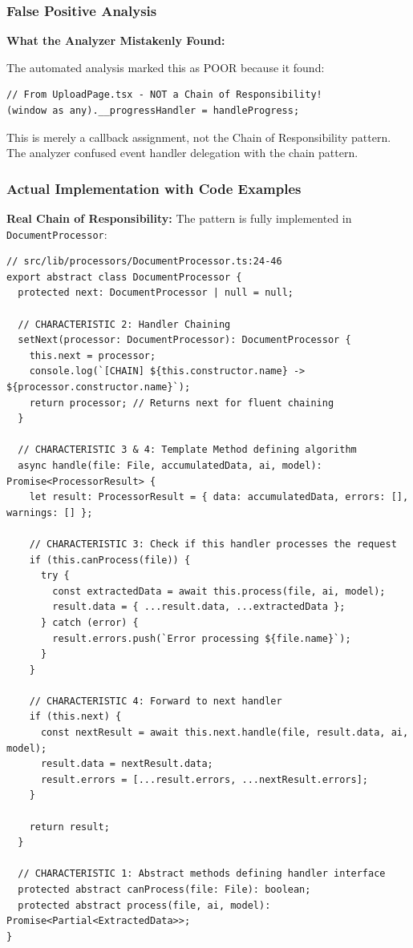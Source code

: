 \documentclass[11pt]{article}
\begin{document}
\subsubsection{False Positive Analysis}
\textbf{What the Analyzer Mistakenly Found:}

The automated analysis marked this as POOR because it found:
\begin{verbatim}
// From UploadPage.tsx - NOT a Chain of Responsibility!
(window as any).__progressHandler = handleProgress;
\end{verbatim}

This is merely a callback assignment, not the Chain of Responsibility pattern. The analyzer confused event handler delegation with the chain pattern.

\subsubsection{Actual Implementation with Code Examples}

\textbf{Real Chain of Responsibility:} The pattern is fully implemented in \texttt{DocumentProcessor}:

\begin{verbatim}
// src/lib/processors/DocumentProcessor.ts:24-46
export abstract class DocumentProcessor {
  protected next: DocumentProcessor | null = null;

  // CHARACTERISTIC 2: Handler Chaining
  setNext(processor: DocumentProcessor): DocumentProcessor {
    this.next = processor;
    console.log(`[CHAIN] ${this.constructor.name} -> ${processor.constructor.name}`);
    return processor; // Returns next for fluent chaining
  }

  // CHARACTERISTIC 3 & 4: Template Method defining algorithm
  async handle(file: File, accumulatedData, ai, model): Promise<ProcessorResult> {
    let result: ProcessorResult = { data: accumulatedData, errors: [], warnings: [] };

    // CHARACTERISTIC 3: Check if this handler processes the request
    if (this.canProcess(file)) {
      try {
        const extractedData = await this.process(file, ai, model);
        result.data = { ...result.data, ...extractedData };
      } catch (error) {
        result.errors.push(`Error processing ${file.name}`);
      }
    }

    // CHARACTERISTIC 4: Forward to next handler
    if (this.next) {
      const nextResult = await this.next.handle(file, result.data, ai, model);
      result.data = nextResult.data;
      result.errors = [...result.errors, ...nextResult.errors];
    }

    return result;
  }

  // CHARACTERISTIC 1: Abstract methods defining handler interface
  protected abstract canProcess(file: File): boolean;
  protected abstract process(file, ai, model): Promise<Partial<ExtractedData>>;
}
\end{verbatim}
\end{document}
